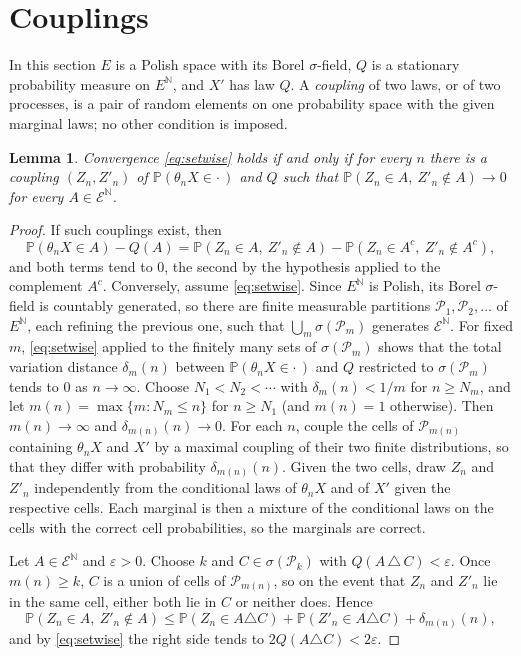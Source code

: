 \documentclass[11pt]{amsart}
\newtheorem{lemma}[theorem]{Lemma}
\theoremstyle{definition}
\theoremstyle{remark}
\newcommand{\N}{\mathbb N}
\newcommand{\Prob}{\mathbb P}
\newcommand{\cE}{\mathcal E}
\begin{document}
\section{Couplings}\label{sec:coupling}

In this section $E$ is a Polish space with its Borel $\sigma$-field, $Q$ is a stationary probability measure on
$E^\N$, and $X'$ has law $Q$. A \emph{coupling} of two laws, or of two processes, is a pair of random elements on one
probability space with the given marginal laws; no other condition is imposed.

\begin{lemma}\label{lem:family}
Convergence \eqref{eq:setwise} holds if and only if for every $n$ there is a coupling $(Z_n,Z'_n)$ of
$\Prob(\theta_nX\in\cdot\,)$ and $Q$ such that $\Prob(Z_n\in A,\ Z'_n\notin A)\to0$ for every $A\in\cE^\N$.
\end{lemma}

\begin{proof}
If such couplings exist, then
\[
\Prob(\theta_nX\in A)-Q(A)=\Prob(Z_n\in A,\ Z'_n\notin A)-\Prob(Z_n\in A^c,\ Z'_n\notin A^c),
\]
and both terms tend to $0$, the second by the hypothesis applied to the complement $A^c$.
Conversely, assume \eqref{eq:setwise}. Since $E^\N$ is Polish, its Borel $\sigma$-field is countably generated, so
there are finite measurable partitions $\mathcal P_1,\mathcal P_2,\dots$ of $E^\N$, each refining the previous one,
such that $\bigcup_m\sigma(\mathcal P_m)$ generates $\cE^\N$. For fixed $m$, \eqref{eq:setwise} applied to the finitely
many sets of $\sigma(\mathcal P_m)$ shows that the total variation distance $\delta_m(n)$ between
$\Prob(\theta_nX\in\cdot\,)$ and $Q$ restricted to $\sigma(\mathcal P_m)$ tends to $0$ as $n\to\infty$. Choose
$N_1<N_2<\cdots$ with $\delta_m(n)<1/m$ for $n\ge N_m$, and let $m(n)=\max\{m:N_m\le n\}$ for $n\ge N_1$ (and
$m(n)=1$ otherwise). Then $m(n)\to\infty$ and $\delta_{m(n)}(n)\to0$. For each $n$, couple the cells of
$\mathcal P_{m(n)}$ containing $\theta_nX$ and $X'$ by a maximal coupling of their two finite distributions, so that
they differ with probability $\delta_{m(n)}(n)$. Given the two cells, draw $Z_n$ and $Z'_n$ independently from the
conditional laws of $\theta_nX$ and of $X'$ given the respective cells. Each marginal is then a mixture of the
conditional laws on the cells with the correct cell probabilities, so the marginals are correct.

Let $A\in\cE^\N$ and $\varepsilon>0$. Choose $k$ and $C\in\sigma(\mathcal P_k)$ with $Q(A\,\triangle\,C)<\varepsilon$.
Once $m(n)\ge k$, $C$ is a union of cells of $\mathcal P_{m(n)}$, so on the event that $Z_n$ and $Z'_n$ lie in the
same cell, either both lie in $C$ or neither does. Hence
\[
\Prob(Z_n\in A,\ Z'_n\notin A)\le\Prob(Z_n\in A\triangle C)+\Prob(Z'_n\in A\triangle C)+\delta_{m(n)}(n),
\]
and by \eqref{eq:setwise} the right side tends to $2Q(A\triangle C)<2\varepsilon$.
\end{proof}
\end{document}
